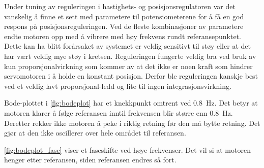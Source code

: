 Under tuning av reguleringen i hastighets- og posisjonsregulatoren var det vanskelig å finne et sett med parametere til potensiometerene for å få en god respons på posisjonsreguleringen. 
Ved de fleste kombinasjoner av parametere endte motoren opp med å vibrere med høy frekvens rundt referansepunktet. 
Dette kan ha blitt forårsaket av systemet er veldig sensitivt til støy eller at det har vært veldig mye støy i kretsen.
Reguleringen fungerte veldig bra ved bruk av kun proporsjonalvirkning som kommer av at det ikke er noen kraft som hindrer servomotoren i å holde en konstant posisjon.
Derfor ble reguleringen kanskje best ved et veldig lavt proporsjonal-ledd og lite til ingen integrasjonsvirkning.


Bode-plottet i \autoref{fig:bodeplot} har et knekkpunkt omtrent ved \SI{0.8}{\hertz}. Det betyr at motoren klarer å følge referansen inntil frekvensen blir større enn \SI{0.8}{\hertz}. Deretter rekker ikke motoren å peke i riktig retning før den må bytte retning. Det gjør at den ikke oscillerer over hele området til referansen.

\autoref{fig:bodeplot_fase} viser et faseskifte ved høye frekvenser. Det vil si at motoren henger etter referansen, siden referansen endres så fort.

























%     


